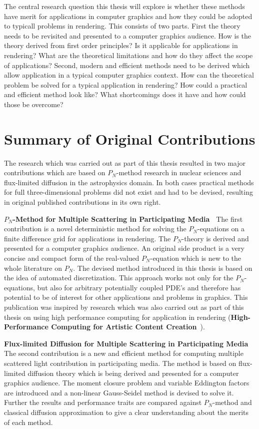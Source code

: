 The central research question this thesis will explore is whether these methods have merit for applications in computer graphics and how they could be adopted to typicall problems in rendering. This consists of two parts. First the theory needs to be revisited and presented to a computer graphics audience. How is the theory derived from first order principles? Is it applicable for applications in rendering? What are the theoretical limitations and how do they affect the scope of applications? Second, modern and efficient methods need to be derived which allow application in a typical computer graphics context. How can the theoretical problem be solved for a typical application in rendering? How could a practical and efficient method look like? What shortcomings does it have and how could those be overcome?

\section{Summary of Original Contributions}

The research which was carried out as part of this thesis resulted in two major contributions which are based on $P_N$-method research in nuclear sciences and flux-limited diffusion in the astrophysics domain. In both cases practical methods for full three-dimensional problems did not exist and had to be devised, resulting in original published contributions in its own right.

\textbf{$P_N$-Method for Multiple Scattering in Participating Media~\cite{Koerner18}} The first contribution is a novel deterministic method for solving the $P_N$-equations on a finite difference grid for applications in rendering. The $P_N$-theory is derived and presented for a computer graphics audience. An original side product is a very concise and compact form of the real-valued $P_N$-equation which is new to the whole literature on $P_N$. The devised method introduced in this thesis is based on the idea of automated discretization. This approach works not only for the $P_N$-equations, but also for arbitrary potentially coupled PDE's and therefore has potential to be of interest for other applications and problems in graphics. This publication was inspired by research which was also carried out as part of this thesis on using high performance computing for application in rendering (\textbf{High-Performance Computing for Artistic Content Creation}~\cite{Koerner17}).

\textbf{Flux-limited Diffusion for Multiple Scattering in Participating Media~\cite{Koerner14}} The second contribution is a new and efficient method for computing multiple scattered light contribution in participating media. The method is based on flux-limited diffusion theory which is being derived and presented for a computer graphics audience. The moment closure problem and variable Eddington factors are introduced and a non-linear Gauss-Seidel method is devised to solve it. Further the results and performance traits are compared against $P_N$-method and classical diffusion approximation to give a clear understanding about the merits of each method.

